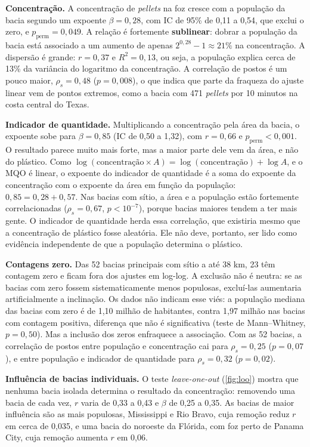 \textbf{Concentração.} A concentração de \textit{pellets} na foz cresce com a população da bacia segundo um expoente $\beta = 0{,}28$, com IC de 95\% de 0,11 a 0,54, que exclui o zero, e $p_{\mathrm{perm}} = 0{,}049$. A relação é fortemente \textbf{sublinear}: dobrar a população da bacia está associado a um aumento de apenas $2^{0{,}28} - 1 \approx 21\%$ na concentração. A dispersão é grande: $r = 0{,}37$ e $R^2 = 0{,}13$, ou seja, a população explica cerca de 13\% da variância do logaritmo da concentração. A correlação de postos é um pouco maior, $\rho_s = 0{,}48$ ($p = 0{,}008$), o que indica que parte da fraqueza do ajuste linear vem de pontos extremos, como a bacia com 471 \textit{pellets} por 10 minutos na costa central do Texas.

\textbf{Indicador de quantidade.} Multiplicando a concentração pela área da bacia, o expoente sobe para $\beta = 0{,}85$ (IC de 0,50 a 1,32), com $r = 0{,}66$ e $p_{\mathrm{perm}} < 0{,}001$. O resultado parece muito mais forte, mas a maior parte dele vem da área, e não do plástico. Como $\log(\text{concentração} \times A) = \log(\text{concentração}) + \log A$, e o MQO é linear, o expoente do indicador de quantidade é a soma do expoente da concentração com o expoente da área em função da população: $0{,}85 = 0{,}28 + 0{,}57$. Nas bacias com sítio, a área e a população estão fortemente correlacionadas ($\rho_s = 0{,}67$, $p < 10^{-7}$), porque bacias maiores tendem a ter mais gente. O indicador de quantidade herda essa correlação, que existiria mesmo que a concentração de plástico fosse aleatória. Ele não deve, portanto, ser lido como evidência independente de que a população determina o plástico.

\textbf{Contagens zero.} Das 52 bacias principais com sítio a até 38 km, 23 têm contagem zero e ficam fora dos ajustes em log-log. A exclusão não é neutra: se as bacias com zero fossem sistematicamente menos populosas, excluí-las aumentaria artificialmente a inclinação. Os dados não indicam esse viés: a população mediana das bacias com zero é de 1,10 milhão de habitantes, contra 1,97 milhão nas bacias com contagem positiva, diferença que não é significativa (teste de Mann--Whitney, $p = 0{,}50$). Mas a inclusão dos zeros enfraquece a associação. Com as 52 bacias, a correlação de postos entre população e concentração cai para $\rho_s = 0{,}25$ ($p = 0{,}07$), e entre população e indicador de quantidade para $\rho_s = 0{,}32$ ($p = 0{,}02$).

\textbf{Influência de bacias individuais.} O teste \textit{leave-one-out} (\autoref{fig:loo}) mostra que nenhuma bacia isolada determina o resultado da concentração: removendo uma bacia de cada vez, $r$ varia de 0,33 a 0,43 e $\beta$ de 0,25 a 0,35. As bacias de maior influência são as mais populosas, Mississippi e Rio Bravo, cuja remoção reduz $r$ em cerca de 0,035, e uma bacia do noroeste da Flórida, com foz perto de Panama City, cuja remoção aumenta $r$ em 0,06.

